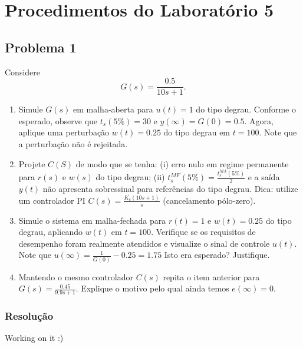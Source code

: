 \documentclass[
]{book}
\providecommand{\tightlist}{%
  \setlength{\itemsep}{0pt}\setlength{\parskip}{0pt}}
\begin{document}
\hypertarget{procedimentos-do-laboratuxf3rio-5}{%
\section*{Procedimentos do Laboratório 5}\label{procedimentos-do-laboratuxf3rio-5}}

\hypertarget{problema-1}{%
\subsection*{Problema 1}\label{problema-1}}

Considere
\[
G(s) = \frac {0.5}{10s+1}.
\]

\begin{enumerate}
\def\labelenumi{(\alph{enumi})}
\tightlist
\item
  Simule \(G(s)\) em malha-aberta para \(u(t) = 1\) do tipo degrau. Conforme o esperado, observe que \(t_s(5\%) = 30\) e \(y(\infty) = G(0) = 0.5\). Agora, aplique uma perturbação \(w(t) = 0.25\) do tipo degrau em \(t=100\). Note que a perturbação não é rejeitada.
\item
  Projete \(C(S)\) de modo que se tenha: (i) erro nulo em regime permanente para \(r(s)\) e \(w(s)\) do tipo degrau; (ii) \(t_s^{MF}(5\%) = \frac {t_s^{MA}(5\%)}{2}\) e a saída \(y(t)\) não apresenta sobressinal para referências do tipo degrau. Dica: utilize um controlador PI \(C(s) = \frac{K_c(10s+1)}{s}\) (cancelamento pólo-zero).
\item
  Simule o sistema em malha-fechada para \(r(t) =1\) e \(w(t) = 0.25\) do tipo degrau, aplicando \(w(t)\) em \(t=100\). Verifique se os requisitos de desempenho foram realmente atendidos e visualize o sinal de controle \(u(t)\). Note que \(u(\infty) = \frac {1}{G(0)}-0.25 = 1.75\) Isto era esperado? Justifique.
\item
  Mantendo o mesmo controlador \(C(s)\) repita o item anterior para \(G(s) = \frac {0.45}{9.9s+1}\). Explique o motivo pelo qual ainda temos \(e(\infty) = 0\).
\end{enumerate}

\hypertarget{resoluuxe7uxe3o}{%
\subsubsection*{Resolução}\label{resoluuxe7uxe3o}}

Working on it :)
\end{document}
